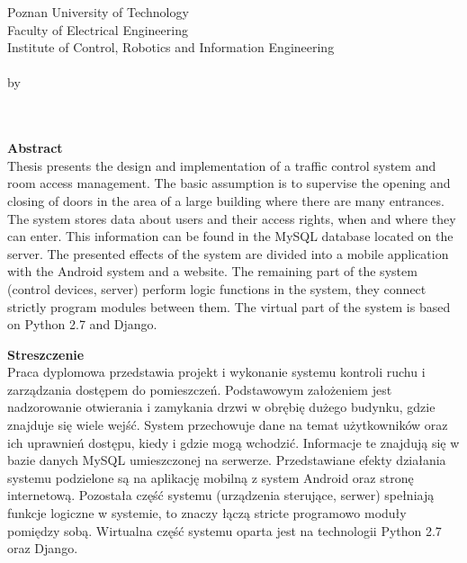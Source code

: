 \newpage
\thispagestyle{empty}
\begin{center}
Poznan University of Technology\\
Faculty of Electrical Engineering\\
Institute of Control, Robotics and Information Engineering\\
  \vspace{20mm}
\huge{\TytulAngielski} \\
\Large{by}\\
  \vspace{5mm}
\Large{\StudentA}\\
\Large{\StudentB}\\
  \vspace{20mm}

\normalsize\textbf{Abstract} \\
{Thesis presents the design and implementation of a traffic control system and room access management. The basic assumption is to supervise the opening and closing of doors in the area of a large building where there are many entrances. The system stores data about users and their access rights, when and where they can enter. This information can be found in the MySQL database located on the server. The presented effects of the system are divided into a mobile application with the Android system and a website. The remaining part of the system (control devices, server) perform logic functions in the system, they connect strictly program modules between them. The virtual part of the system is based on Python 2.7 and Django.} 

\end{center}

\begin{center}
 \textbf{Streszczenie} \\
 {Praca dyplomowa przedstawia projekt i wykonanie systemu kontroli ruchu i zarządzania dostępem do pomieszczeń. Podstawowym założeniem jest nadzorowanie otwierania i zamykania drzwi w obrębię dużego budynku, gdzie znajduje się wiele wejść. System przechowuje dane na temat użytkowników oraz ich uprawnień dostępu, kiedy i gdzie mogą wchodzić. Informacje te znajdują się w bazie danych MySQL umieszczonej na serwerze. Przedstawiane efekty działania systemu podzielone są na aplikację mobilną z system Android oraz stronę internetową. Pozostała część systemu (urządzenia sterujące, serwer) spełniają funkcje logiczne w systemie, to znaczy łączą stricte programowo moduły pomiędzy sobą. Wirtualna część systemu oparta jest na technologii Python 2.7 oraz Django.} 
\end{center}

 
